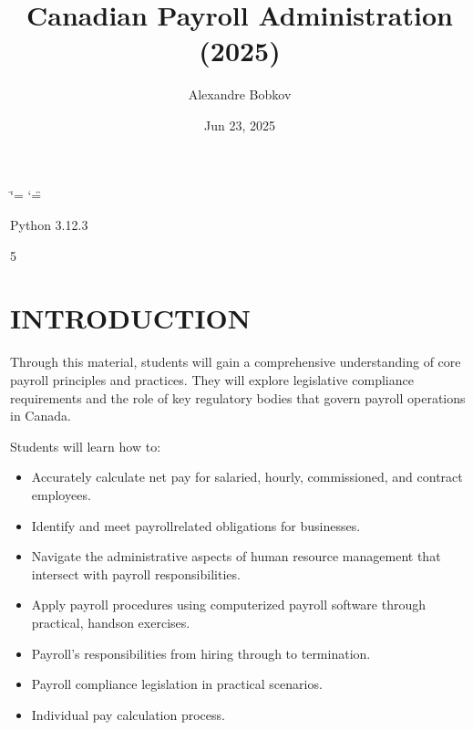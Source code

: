 \documentclass[letterpaper,10pt,english]{sphinxmanual}
\title{Canadian Payroll Administration (2025)}
\date{Jun 23, 2025}
\author{Alexandre Bobkov}
\begin{document}
\ifdefined\shorthandoff
  \ifnum\catcode`\=\string=\active\shorthandoff{=}\fi
  \ifnum\catcode`\"=\active{}\fi
\fi

\pagestyle{empty}
\sphinxmaketitle
\pagestyle{plain}
\sphinxtableofcontents
\pagestyle{normal}
\label{\detokenize{index::doc}}


\begin{sphinxVerbatim}[commandchars=\\\{\}]
Python 3.12.3
\end{sphinxVerbatim}

\begin{sphinxVerbatim}[commandchars=\\\{\}]
5
\end{sphinxVerbatim}

\sphinxstepscope


\chapter{INTRODUCTION}
\label{\detokenize{introduction:introduction}}\label{\detokenize{introduction::doc}}
\sphinxAtStartPar
Through this material, students will gain a comprehensive understanding of core payroll principles and practices. They will explore legislative compliance requirements and the role of key regulatory bodies that govern payroll operations in Canada.

\sphinxAtStartPar
Students will learn how to:
\begin{itemize}
\item {} 
\sphinxAtStartPar
Accurately calculate net pay for salaried, hourly, commissioned, and contract employees.

\item {} 
\sphinxAtStartPar
Identify and meet payroll\sphinxhyphen{}related obligations for businesses.

\item {} 
\sphinxAtStartPar
Navigate the administrative aspects of human resource management that intersect with payroll responsibilities.

\item {} 
\sphinxAtStartPar
Apply payroll procedures using computerized payroll software through practical, hands\sphinxhyphen{}on exercises.

\item {} 
\sphinxAtStartPar
Payroll’s responsibilities from hiring through to termination.

\item {} 
\sphinxAtStartPar
Payroll compliance legislation in practical scenarios.

\item {} 
\sphinxAtStartPar
Individual pay calculation process.

\end{itemize}
\end{document}
